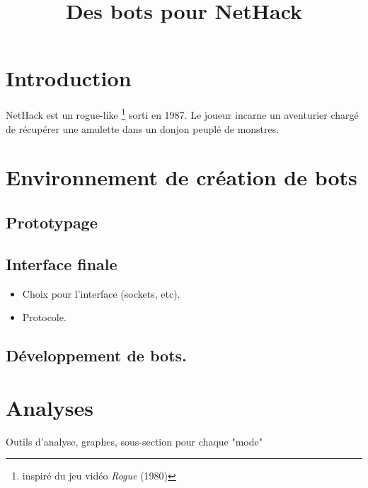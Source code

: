 \documentclass{article}
\title{Des bots pour NetHack}
\begin{document}
\maketitle
\tableofcontents

\pagebreak

\section{Introduction}

NetHack est un rogue-like \footnote{inspiré du jeu vidéo \emph{Rogue} (1980)}
sorti en 1987. Le joueur incarne un aventurier chargé de récupérer une
amulette dans un donjon peuplé de monstres.


\section{Environnement de création de bots}

\subsection{Prototypage}

\subsection{Interface finale}

\begin{itemize}
\item Choix pour l'interface (sockets, etc).
\item Protocole.
\end{itemize}

\subsection{Développement de bots.}


\section{Analyses}

Outils d'analyse, graphes, sous-section pour chaque "mode"
\end{document}
